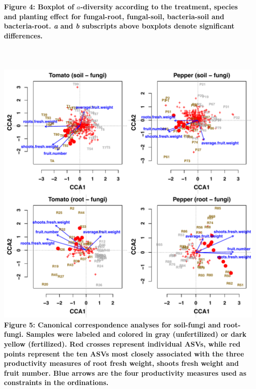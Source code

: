 \documentclass[11pt,]{article}
\begin{document}
\textbf{Figure 4: Boxplot of \(a\)-diversity according to the treatment,
species and planting effect for fungal-root, fungal-soil, bacteria-soil
and bacteria-root. \emph{a} and \emph{b} subscripts above boxplots
denote significant differences.}\\
\hspace*{0.333em}\\
\hspace*{0.333em}\\
\hspace*{0.333em}\\
\includegraphics{../figures/fungi/Figure5f_rda.pdf}\\
\textbf{Figure 5: Canonical correspondence analyses for soil-fungi and
root-fungi. Samples were labeled and colored in gray (unfertilized) or
dark yellow (fertilized). Red crosses represent individual ASVs, while
red points represent the ten ASVs most closely associated with the three
productivity measures of root fresh weight, shoots fresh weight and
fruit number. Blue arrows are the four productivity measures used as
constraints in the ordinations.} ~\\
\hspace*{0.333em}\\
\hspace*{0.333em}\\
\end{document}
